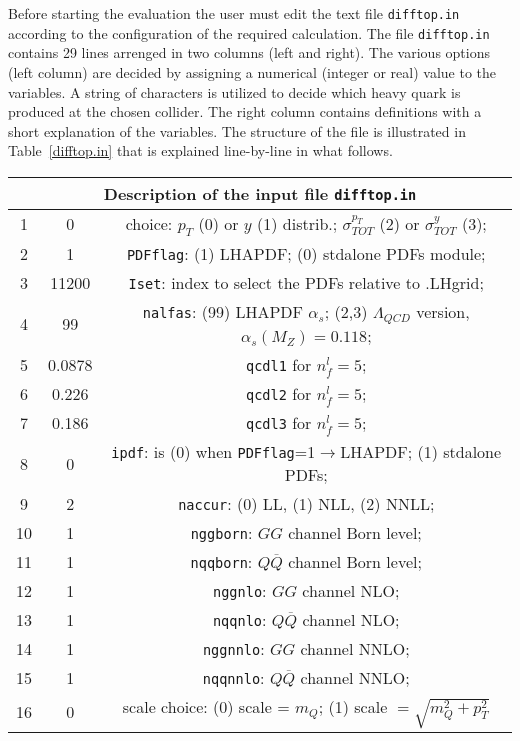 \documentclass[11pt]{article}
\begin{document}
{Before starting the evaluation the user must edit the text file \texttt{difftop.in} according 
to the configuration of the required calculation.
The file \texttt{difftop.in} contains 29 lines arrenged in two columns (left and right). 
The various options (left column) are decided by assigning a numerical (integer or real) value to the variables.
A string of characters is utilized to decide which heavy quark is produced at the chosen collider.
The right column contains definitions with a short explanation of the variables. 
The structure of the file is illustrated in Table~\ref{difftop.in} that is explained line-by-line in what follows.
\begin{table}[ht]
\begin{centering}
\begin{scriptsize}
\begin{tabular}{|c|c|c|}
\hline 
\multicolumn{3}{|c|}{Description of the input file \texttt{difftop.in}} \tabularnewline
\hline 
\hline 
1  &     0         &       choice: $p_T$ (0) or $y$ (1) distrib.; $\sigma^{p_T}_{TOT}$ (2) or $\sigma_{TOT}^y$ (3); \tabularnewline
	\hline
2  &     1         &       \texttt{PDFflag}: (1) LHAPDF; (0) stdalone PDFs module;\tabularnewline
	\hline
3  &     11200     &       \texttt{Iset}: index to select the PDFs relative to .LHgrid;\tabularnewline
	\hline
4  &     99        &       \texttt{nalfas}: (99) LHAPDF $\alpha_s$; (2,3) $\Lambda_{QCD}$ version, $\alpha_s(M_Z) = 0.118$;\tabularnewline 
	\hline
5  &     0.0878    &       \texttt{qcdl1} for $n^l_{f}=5$;\tabularnewline
	\hline
6  &     0.226     &       \texttt{qcdl2} for $n^l_{f}=5$; \tabularnewline
	\hline
7  &     0.186     &       \texttt{qcdl3} for $n^l_{f}=5$; \tabularnewline
	\hline
8  & 	0         & 	  \texttt{ipdf}: is (0) when \texttt{PDFflag}=1$\rightarrow$LHAPDF; (1) stdalone PDFs;\tabularnewline 
	\hline
9  & 	2         & 	  \texttt{naccur}: (0)  LL, (1) NLL, (2) NNLL;\tabularnewline
	\hline
10  &  	1         &  	  \texttt{nggborn}: $GG$ channel Born level;\tabularnewline
	\hline
11  & 	1         & 	  \texttt{nqqborn}: $Q\overline{Q}$ channel Born level;\tabularnewline
	\hline
12  & 	1         & 	  \texttt{nggnlo}: $GG$ channel NLO;\tabularnewline
	\hline
13  & 	1         & 	  \texttt{nqqnlo}: $Q\overline{Q}$ channel NLO;\tabularnewline
	\hline
14  & 	1         & 	  \texttt{nggnnlo}: $GG$ channel NNLO;\tabularnewline
	\hline
15  & 	1         & 	  \texttt{nqqnnlo}: $Q\overline{Q}$ channel NNLO;\tabularnewline
	\hline
16  & 	0         & 	  scale choice: (0) scale = $m_Q$; (1) scale $= \sqrt{m_Q^2+p_T^2}$\tabularnewline

\end{tabular}
\end{scriptsize}
\end{centering}
\end{table}}
\end{document}
